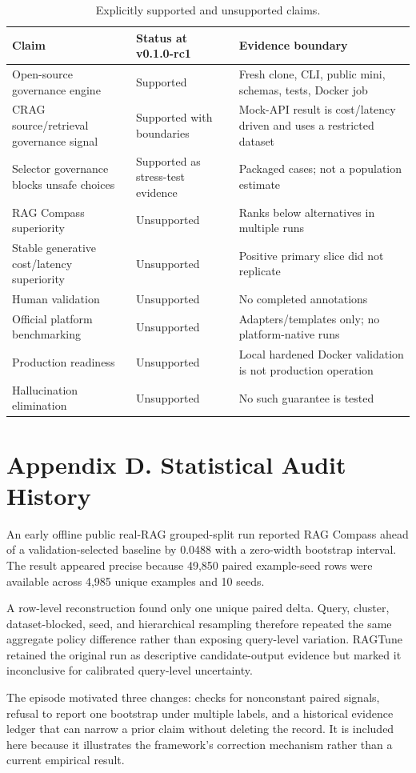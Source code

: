 \documentclass[11pt]{article}
\begin{document}
\begin{table}[t]
\centering
\caption{Explicitly supported and unsupported claims.}
\small
\begin{tabularx}{\linewidth}{>{\raggedright\arraybackslash}X>{\raggedright\arraybackslash}X>{\raggedright\arraybackslash}X}
\toprule
\textbf{Claim} & \textbf{Status at v0.1.0-rc1} & \textbf{Evidence boundary} \\
\midrule
Open-source governance engine & Supported & Fresh clone, CLI, public mini, schemas, tests, Docker job \\
CRAG source/retrieval governance signal & Supported with boundaries & Mock-API result is cost/latency driven and uses a restricted dataset \\
Selector governance blocks unsafe choices & Supported as stress-test evidence & Packaged cases; not a population estimate \\
RAG Compass superiority & Unsupported & Ranks below alternatives in multiple runs \\
Stable generative cost/latency superiority & Unsupported & Positive primary slice did not replicate \\
Human validation & Unsupported & No completed annotations \\
Official platform benchmarking & Unsupported & Adapters/templates only; no platform-native runs \\
Production readiness & Unsupported & Local hardened Docker validation is not production operation \\
Hallucination elimination & Unsupported & No such guarantee is tested \\
\bottomrule
\end{tabularx}
\end{table}

\section{Appendix D. Statistical Audit History}
An early offline public real-RAG grouped-split run reported RAG Compass ahead of a validation-selected baseline by 0.0488 with a zero-width bootstrap interval. The result appeared precise because 49,850 paired example-seed rows were available across 4,985 unique examples and 10 seeds.

A row-level reconstruction found only one unique paired delta. Query, cluster, dataset-blocked, seed, and hierarchical resampling therefore repeated the same aggregate policy difference rather than exposing query-level variation. RAGTune retained the original run as descriptive candidate-output evidence but marked it inconclusive for calibrated query-level uncertainty.

The episode motivated three changes: checks for nonconstant paired signals, refusal to report one bootstrap under multiple labels, and a historical evidence ledger that can narrow a prior claim without deleting the record. It is included here because it illustrates the framework's correction mechanism rather than a current empirical result.



\end{document}
